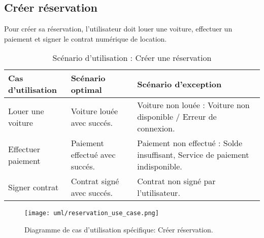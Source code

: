 \subsection{Créer réservation}
Pour créer sa réservation, l'utilisateur doit louer une voiture, effectuer un paiement et signer le contrat numérique de location.\\
\begin{table}[H]
    \begin{center}
        \begin{tabularx}{\textwidth} {
                | >{\centering\arraybackslash}X
                | >{\centering\arraybackslash}X
                | >{\centering\arraybackslash}X |}
            \hline
            Cas d'utilisation  & Scénario optimal               & Scénario d'exception                                                         \\
            \hline
            Louer une voiture  & Voiture louée avec succés.     & Voiture non louée : Voiture non disponible / Erreur de connexion.            \\
            \hline
            Effectuer paiement & Paiement effectué avec succés. & Paiement non effectué : Solde insuffisant, Service de paiement indisponible. \\
            \hline
            Signer contrat     & Contrat signé avec succés.     & Contrat non signé par l'utilisateur.                                         \\
            \hline
        \end{tabularx}
        \captionsetup{justification=centering}
        \caption{Scénario d'utilisation : Créer une réservation}
        \label{tab:reservation_scenario}
    \end{center}
\end{table}
\begin{figure}[H]
    \centering
    \texttt{[image: uml/reservation\_use\_case.png]}
    \vspace{1cm}
    \captionsetup{justification=centering}
    \caption{Diagramme de cas d'utilisation spécifique: Créer réservation.}
    \label{fig:use_case_create_res}
\end{figure}
